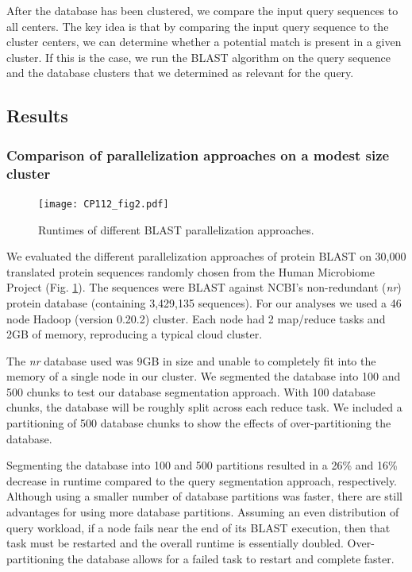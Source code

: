 \documentclass[12pt,\mydriver]{thesis}
\begin{document}
After the database has been clustered, we compare the input query sequences to all centers. The key idea is that by comparing the input query sequence to the cluster centers, we can determine whether a potential match is present in a given cluster. If this is the case, we run the BLAST algorithm on the query sequence and the database clusters that we determined as relevant for the query.


\subsection{Results}

\subsubsection{Comparison of parallelization approaches on a modest size cluster}

\begin{figure}[!htb]\begin{center}
\texttt{[image: CP112\_fig2.pdf]}
\end{center}
\renewcommand{\baselinestretch}{1}
\small\normalsize
\begin{quote}
\caption[Runtimes of different BLAST parallelization approaches]{Runtimes of different BLAST parallelization approaches.}
\label{fig:parallel_approaches}
\end{quote}
\end{figure}
\renewcommand{\baselinestretch}{2}
\small\normalsize


We evaluated the different parallelization approaches of protein BLAST on 30,000 translated protein sequences randomly chosen from the Human Microbiome Project\cite{peterson2009nih} (Fig. \ref{fig:parallel_approaches}).
The sequences were BLAST against NCBI's non-redundant (\emph{nr}) protein database (containing 3,429,135 sequences).
For our analyses we used a 46 node Hadoop (version 0.20.2) cluster.  Each node had 2 map/reduce tasks and 2GB of memory, reproducing a typical cloud cluster.

The \emph{nr} database used was 9GB in size and unable to completely fit into the memory of a single node in our cluster.
We segmented the database into 100 and 500 chunks to test our database segmentation approach.
With 100 database chunks, the database will be roughly split across each reduce task.
We included a partitioning of 500 database chunks to show the effects of over-partitioning the database.

Segmenting the database into 100 and 500 partitions resulted in a 26\% and 16\% decrease in runtime compared to the query segmentation approach, respectively.
Although using a smaller number of database partitions was faster, there are still advantages for using more database partitions.
Assuming an even distribution of query workload, if a node fails near the end of its BLAST execution, then that task must be restarted and the overall runtime is essentially doubled.
Over-partitioning the database allows for a failed task to restart and complete faster.
\end{document}
